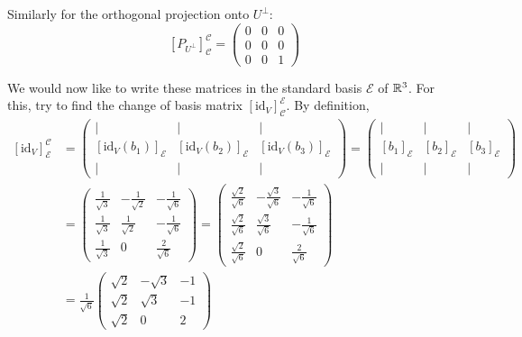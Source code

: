 \documentclass[12pt]{article}
\begin{document}
\begin{enumerate}[label=\alph*)]
    Similarly for the orthogonal projection onto $U^\perp$:
    $$
        \boxed{[P_{U^\perp}]_{\mathcal{C}}^{\mathcal{C}} = 
        \begin{pmatrix}
            0 & 0 & 0 \\
            0 & 0 & 0 \\
            0 & 0 & 1
        \end{pmatrix}}
    $$

    We would now like to write these matrices in the standard basis $\mathcal{E}$ of $\mathbb{R}^3$. For this, try to find the change of basis matrix $[\mathrm{id}_V]_{\mathcal{C}}^{\mathcal{E}}$. By definition,
    $$
    \begin{aligned}
        [\mathrm{id}_V]_{\mathcal{E}}^{\mathcal{C}} &=  \begin{pmatrix} | & | & | \\ [\mathrm{id}_V(b_1)]_{\mathcal{E}} & [\mathrm{id}_V(b_2)]_{\mathcal{E}} & [\mathrm{id}_V(b_3)]_{\mathcal{E}} \\ | & | & | \end{pmatrix}
        = \begin{pmatrix} | & | & | \\ [b_1]_{\mathcal{E}} & [b_2]_{\mathcal{E}} & [b_3]_{\mathcal{E}} \\ | & | & | \end{pmatrix} \\
        &= 
        \begin{pmatrix}
            \frac{1}{\sqrt{3}} & -\frac{1}{\sqrt{2}} & -\frac{1}{\sqrt{6}} \\
            \frac{1}{\sqrt{3}} & \frac{1}{\sqrt{2}} & -\frac{1}{\sqrt{6}} \\
            \frac{1}{\sqrt{3}} & 0 & \frac{2}{\sqrt{6}}
        \end{pmatrix}
        = 
        \begin{pmatrix}
            \frac{\sqrt{2}}{\sqrt{6}} & -\frac{\sqrt{3}}{\sqrt{6}} & -\frac{1}{\sqrt{6}} \\
            \frac{\sqrt{2}}{\sqrt{6}} & \frac{\sqrt{3}}{\sqrt{6}} & -\frac{1}{\sqrt{6}} \\
            \frac{\sqrt{2}}{\sqrt{6}} & 0 & \frac{2}{\sqrt{6}}
        \end{pmatrix} \\
        &= \frac{1}{\sqrt{6}} 
        \begin{pmatrix} 
            \sqrt{2} & -\sqrt{3} & -1 \\ 
            \sqrt{2} & \sqrt{3} & -1 \\ 
            \sqrt{2} & 0 & 2 
        \end{pmatrix}
    \end{aligned}
    $$


\end{enumerate}
\end{document}
